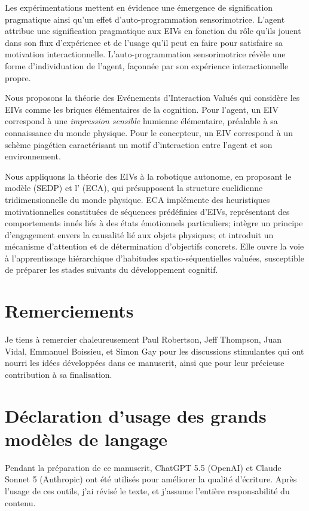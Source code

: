 Les expérimentations mettent en évidence une émergence de signification pragmatique ainsi qu'un effet d'auto-programmation sensorimotrice. 
L'agent attribue une signification pragmatique aux EIVs en fonction du rôle qu'ils jouent dans son flux d'expérience et de l'usage qu'il peut en faire pour satisfaire sa motivation interactionnelle.
L'auto-programmation sensorimotrice révèle une forme d'individuation de l'agent, façonnée par son expérience interactionnelle propre. 

Nous proposons la théorie des Evénements d'Interaction Valués qui considère les EIVs comme les briques élémentaires de la cognition. 
Pour l'agent, un EIV correspond à une \emph{impression sensible} humienne élémentaire, préalable à sa connaissance du monde physique. 
Pour le concepteur, un EIV correspond à un schème piagétien caractérisant un motif d'interaction entre l'agent et son environnement.

Nous appliquons la théorie des EIVs à la robotique autonome, en proposant le modèle  (SEDP) 
et l' (ECA), qui présupposent la structure euclidienne tridimensionnelle du monde physique.
ECA implémente des heuristiques motivationnelles constituées de séquences prédéfinies d'EIVs, représentant des comportements innés liés à des états émotionnels particuliers; intègre un principe d'engagement envers la causalité lié aux objets physiques; et  introduit un mécanisme d'attention et de détermination d'objectifs concrets. 
Elle ouvre la voie à l'apprentissage hiérarchique d'habitudes spatio-séquentielles valuées, susceptible de préparer les stades suivants du développement cognitif. 


\pagebreak

\section*{Remerciements}

\noindent
Je tiens à remercier chaleureusement Paul Robertson, Jeff Thompson, Juan Vidal, Emmanuel Boissieu, et Simon Gay pour les discussions stimulantes qui ont nourri les idées développées dans ce manuscrit, ainsi que pour leur précieuse contribution à sa finalisation.

\section*{Déclaration d'usage des grands modèles de langage}

\noindent
Pendant la préparation de ce manuscrit, ChatGPT 5.5 (OpenAI) et Claude Sonnet 5 (Anthropic) ont été utilisés pour améliorer la qualité d'écriture. 
Après l'usage de ces outils, j'ai révisé le texte, et j'assume l'entière responsabilité du contenu. 


